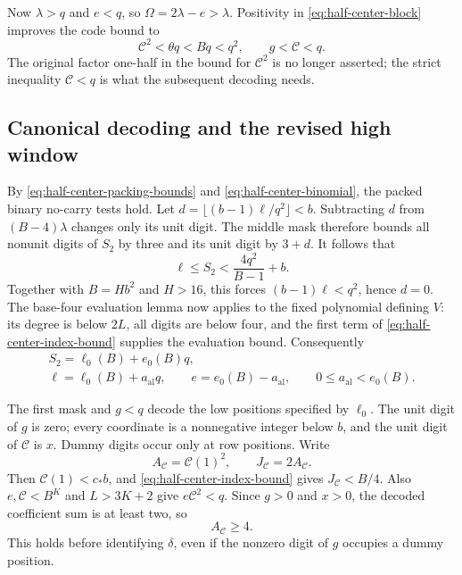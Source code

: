 Now $\lambda>q$ and $e<q$, so $\Omega=2\lambda-e>\lambda$.
Positivity in \eqref{eq:half-center-block} improves the code bound to
\begin{equation}\label{eq:half-center-post-C}
 \mathcal C^2<\theta q<Bq<q^2,
 \qquad g<\mathcal C<q.
\end{equation}
The original factor one-half in the bound for $\mathcal C^2$ is no
longer asserted; the strict inequality $\mathcal C<q$ is what the
subsequent decoding needs.

\subsection{Canonical decoding and the revised high window}

By \eqref{eq:half-center-packing-bounds} and
\eqref{eq:half-center-binomial}, the packed binary no-carry tests
hold. Let $d=\lfloor(b-1)\ell/q^2\rfloor<b$. Subtracting $d$
from $(B-4)\lambda$ changes only its unit digit. The middle mask
therefore bounds all nonunit digits of $S_2$ by three and its unit
digit by $3+d$. It follows that
\[
 \ell\le S_2<\frac{4q^2}{B-1}+b.
\]
Together with $B=Hb^2$ and $H>16$, this forces
$(b-1)\ell<q^2$, hence $d=0$. The base-four evaluation lemma now
applies to the fixed polynomial defining $V$: its degree is below
$2L$, all digits are below four, and the first term of
\eqref{eq:half-center-index-bound} supplies the evaluation bound.
Consequently
\begin{equation}\label{eq:half-center-alias}
 \begin{gathered}
 S_2=\ell_0(B)+e_0(B)q,\\
 \ell=\ell_0(B)+a_{\mathrm{al}}q,\qquad
 e=e_0(B)-a_{\mathrm{al}},\qquad
 0\le a_{\mathrm{al}}<e_0(B).
 \end{gathered}
\end{equation}

The first mask and $g<q$ decode the low positions specified by
$\ell_0$. The unit digit of $g$ is zero; every coordinate is a
nonnegative integer below $b$, and the unit digit of $\mathcal C$
is $x$. Dummy digits occur only at row positions. Write
\[
 A_{\mathcal C}=\mathcal C(1)^2,
 \qquad J_{\mathcal C}=2A_{\mathcal C}.
\]
Then $\mathcal C(1)<c_*b$, and
\eqref{eq:half-center-index-bound} gives $J_{\mathcal C}<B/4$.
Also $e,\mathcal C<B^K$ and $L>3K+2$ give $e\mathcal C^2<q$.
Since $g>0$ and $x>0$, the decoded coefficient sum is at least two,
so
\begin{equation}\label{eq:half-center-coefficient-sum}
 A_{\mathcal C}\ge4.
\end{equation}
This holds before identifying $\delta$, even if the nonzero digit
of $g$ occupies a dummy position.

